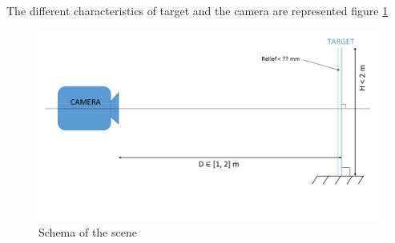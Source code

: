 The different characteristics of target and the camera are represented figure \ref{fig:schema system}


\begin{figure}[h]
  \centerline{\includegraphics[scale=0.4]{fig/schemaSystem.jpg}}
  \caption{Schema of the scene}
  \label{fig:schema system}
\end{figure}

